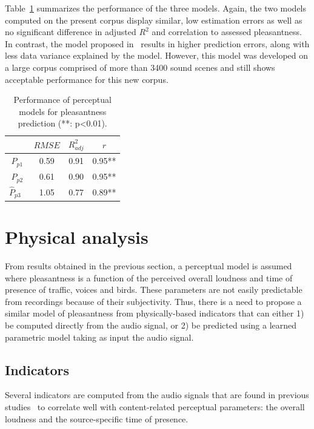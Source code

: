 \documentclass[11pt,a4paper]{article}
\begin{document}
Table~\ref{tab:percm} summarizes the performance of the three models. Again, the two models computed on the present corpus display similar, low estimation errors as well as no significant difference in adjusted $R^2$ and correlation to assessed pleasantness. In contrast, the model proposed in~\cite{ricciardi2014} results in higher prediction errors, along with less data variance explained by the model. However, this model was developed on a large corpus comprised of more than 3400 sound scenes and still shows acceptable performance for this new corpus.  

\begin{table}[t]
\centering
\caption{Performance of perceptual models for pleasantness prediction (**: p<0.01).}
\label{tab:percm}
\begin{tabular}{ c | c | c | c }
\hline
	 & $RMSE$ & $R^2_{adj}$ & $r$ \\ \hline
	$\hat P_{p1}$ & 0.59 & 0.91 & 0.95** \\
	$\hat P_{p2}$ & 0.61 & 0.90 & 0.95** \\
	$\hat P_{p3}$~\cite{ricciardi2014} & 1.05 & 0.77 & 0.89** \\ \hline
\end{tabular}
\end{table}

\section{Physical analysis}

From results obtained in the previous section, a perceptual model is assumed where pleasantness is a function of the perceived overall loudness and time of presence of traffic, voices and birds. These parameters are not easily predictable from recordings because of their subjectivity. Thus, there is a need to propose a similar model of pleasantness from physically-based indicators that can either 1) be computed directly from the audio signal, or 2) be predicted using a learned parametric model taking as input the audio signal.

\subsection{Indicators}

Several indicators are computed from the audio signals that are found in previous studies~\cite{aumond, gontier, lavandier} to correlate well with content-related perceptual parameters: the overall loudness and the source-specific time of presence.\\
\end{document}
